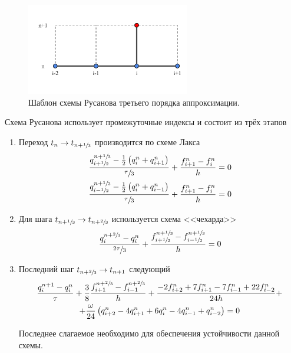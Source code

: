 \begin{figure}[htb]
    \centering
    \includegraphics[trim={55pt 100pt 35pt 100pt},clip,height=4cm]{images/theory/scheme_rusanov.png}
    \caption{Шаблон схемы Русанова третьего порядка аппроксимации.}
    \label{fig:scheme_rusanov}
\end{figure}

Схема Русанова использует промежуточные индексы и состоит из трёх этапов

\begin{enumerate}
    \item Переход $t_n \rightarrow t_{n+\sfrac{1}{3}}$ производится по схеме Лакса
    \begin{equation}
    \begin{gathered}
        \dfrac{q^{n+\sfrac{1}{3}}_{i+\sfrac{1}{2}} - \frac{1}{2}\left(q^n_i + q^n_{i+1}\right)}{\sfrac{\tau}{3}} + \dfrac{f^n_{i+1} - f^n_{i}}{h} = 0 \\
        \dfrac{q^{n+\sfrac{1}{3}}_{i-\sfrac{1}{2}} - \frac{1}{2}\left(q^n_i + q^n_{i-1}\right)}{\sfrac{\tau}{3}} + \dfrac{f^n_{i+1} - f^n_{i}}{h} = 0
    \end{gathered}
   \end{equation}
 
    \item Для шага $t_{n+\sfrac{1}{3}} \rightarrow t_{n+\sfrac{2}{3}}$ используется схема <<чехарда>>
    \begin{equation}
        \dfrac{q^{n+\sfrac{2}{3}}_{i} - q^n_i}{\sfrac{2\tau}{3}} + \dfrac{f^{n+\sfrac{1}{3}}_{i+\sfrac{1}{2}} - f^{n+\sfrac{1}{3}}_{i-\sfrac{1}{2}}}{h} = 0
    \end{equation}

    \item Последний шаг $t_{n+\sfrac{2}{3}} \rightarrow t_{n+1}$ следующий
    \begin{equation}
    \begin{gathered}
        \dfrac{q^{n+1}_i - q^n_i}{\tau} + \dfrac{3}{8}\dfrac{f^{n+\sfrac{2}{3}}_{i+1} - f^{n+\sfrac{2}{3}}_{i-1}}{h} + \dfrac{-2f^n_{i+2} + 7f^n_{i+1} -  7f^n_{i-1} +22f^n_{i-2}}{24h} +\\+ \dfrac{\omega}{24}\left(q^n_{i+2}-  4q^n_{i+1} + 6q^n_{i} - 4 q^n_{i-1} + q^n_{i-2}\right) = 0
    \end{gathered}
    \end{equation}
    
    Последнее слагаемое необходимо для обеспечения устойчивости данной схемы.
\end{enumerate}

